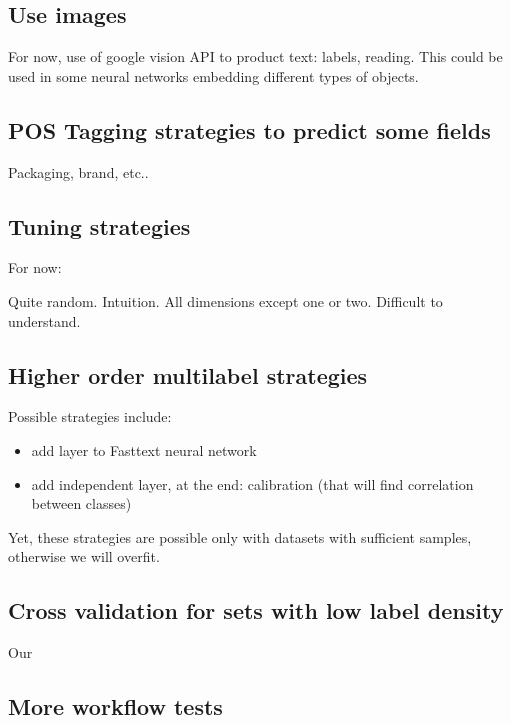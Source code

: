\subsection{Use images}
For now, use of google vision API to product text: labels, reading. This could be used in some neural networks embedding different types of objects.
\subsection{POS Tagging strategies to predict some fields}
Packaging, brand, etc..

\subsection{Tuning strategies}

For now: 

Quite random. Intuition. All dimensions except one or two. Difficult to understand.

\subsection{Higher order multilabel strategies}
Possible strategies include:
\begin{itemize}
	\item add layer to Fasttext neural network
	\item add independent layer, at the end: calibration (that will find correlation between classes)
\end{itemize}

Yet, these strategies are possible only with datasets with sufficient samples, otherwise we will overfit.

\subsection{Cross validation for sets with low label density}

Our 

\subsection{More workflow tests}

